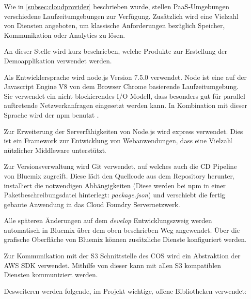 Wie in \autoref{subsec:cloudprovider} beschrieben wurde, stellen \acs{PaaS}-Umgebungen verschiedene Laufzeitumgebungen zur Verfügung. Zusätzlich wird eine Vielzahl von Diensten angeboten, um klassische Anforderungen bezüglich Speicher, Kommunikation oder Analytics zu lösen.

An dieser Stelle wird kurz beschrieben, welche Produkte zur Erstellung der Demoapplikation verwendet werden. 

Als Entwicklersprache wird node.js Version 7.5.0 verwendet. Node ist eine auf der Javascript Engine V8 von dem Browser Chrome basierende Laufzeitumgebung. Sie verwendet ein nicht blockierendes I/O-Modell, dass besonders gut für parallel auftretende Netzwerkanfragen eingesetzt werden kann. In Kombination mit dieser Sprache wird der \ac{npm} benutzt \parencite{nodejs.2017}.

Zur Erweiterung der Serverfähigkeiten von Node.js wird express verwendet. Dies ist ein Framework zur Entwicklung von Webanwendungen, dass eine Vielzahl nützlicher Middleware unterstützt.

Zur Versionsverwaltung wird \gls{Git} verwendet, auf welches auch die \ac{CD} Pipeline von Bluemix zugreift. Diese lädt den Quellcode aus dem Repository herunter, installiert die notwendigen Abhängigkeiten (Diese werden bei \acs{npm} in einer Paketbeschreibungsdatei hinterlegt: \textit{package.json}) und verschiebt die fertig gebaute Anwendung in das Cloud Foundry Servernetzwerk.  

Alle späteren Änderungen auf dem \textit{develop} Entwicklungszweig werden automatisch in Bluemix über dem oben beschrieben Weg angewendet. Über die grafische Oberfläche von Bluemix können zusätzliche Dienste konfiguriert werden.

Zur Kommunikation mit der S3 Schnittstelle des \acs{COS} wird ein Abstraktion der \acs{AWS} \gls{SDK} verwendet. Mithilfe von dieser kann mit allen \acs{S3} kompatiblen Diensten kommuniziert werden.

Desweiteren werden folgende, im Projekt wichtige, offene Bibliotheken verwendet:

